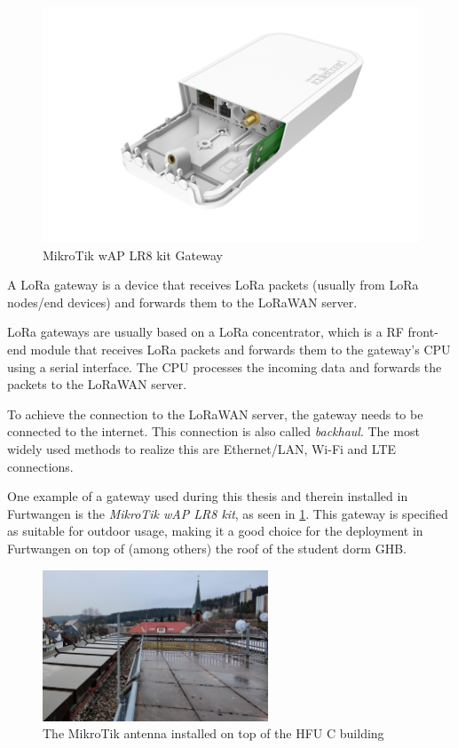 \begin{figure}
    \centering
    \includegraphics[width=.6\textwidth]{pictures/hardware/gateways/mikrotik-lr8-kit.png}
    \caption{MikroTik wAP LR8 kit Gateway~\protect\cite{the_things_industries_bv_lorawan_nodate}}\label{pic:mikrotik-lr8-kit-gateway}
\end{figure}

A \ac{LoRa} gateway is a device that receives \ac{LoRa} packets (usually from \ac{LoRa} nodes/end devices) and forwards them to the \ac{LoRaWAN} server.

\ac{LoRa} gateways are usually based on a \ac{LoRa} concentrator, which is a \ac{RF} front-end module that receives \ac{LoRa} packets and forwards them to the gateway's \ac{CPU} using a serial interface.
The \ac{CPU} processes the incoming data and forwards the packets to the \ac{LoRaWAN} server.

To achieve the connection to the \ac{LoRaWAN} server, the gateway needs to be connected to the internet.
This connection is also called \emph{backhaul}.
The most widely used methods to realize this are Ethernet/\ac{LAN}, Wi-Fi and \ac{LTE} connections.

One example of a gateway used during this thesis and therein installed in Furtwangen is the \emph{MikroTik wAP LR8 kit}, as seen in \cref{pic:mikrotik-lr8-kit-gateway}.
This gateway is specified as suitable for outdoor usage, making it a good choice for the deployment in Furtwangen on top of (among others) the roof of the student dorm \ac{GHB}.

\begin{figure}
    \centering
    \includegraphics[width=0.6\textwidth]{pictures/hardware/gateway-deployment/mikrotik-antenna-c-building.jpg}
    \caption{The MikroTik antenna installed on top of the \ac{HFU} C building}\label{pic:mikrotik-antenna-c-building}
\end{figure}

